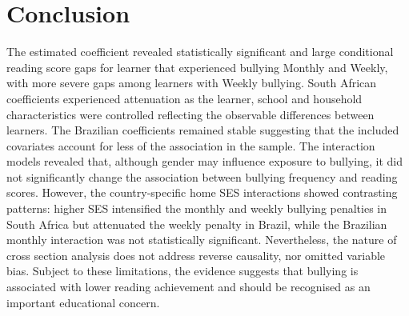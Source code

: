 \section{Conclusion}

The estimated coefficient revealed statistically significant and large conditional reading score gaps for learner that experienced bullying Monthly and Weekly, with more severe gaps among learners with Weekly bullying. South African coefficients experienced attenuation as the learner, school and household characteristics were controlled reflecting the observable differences between learners. The Brazilian coefficients remained stable suggesting that the included covariates account for less of the association in the sample. The interaction models revealed that, although gender may influence exposure to bullying, it did not significantly change the association between bullying frequency and reading scores. However, the country-specific home SES interactions showed contrasting patterns: higher SES intensified the monthly and weekly bullying penalties in South Africa but attenuated the weekly penalty in Brazil, while the Brazilian monthly interaction was not statistically significant. Nevertheless, the nature of cross section analysis does not address reverse causality, nor omitted variable bias. Subject to these limitations, the evidence suggests that bullying is associated with lower reading achievement and should be recognised as an important educational concern.

